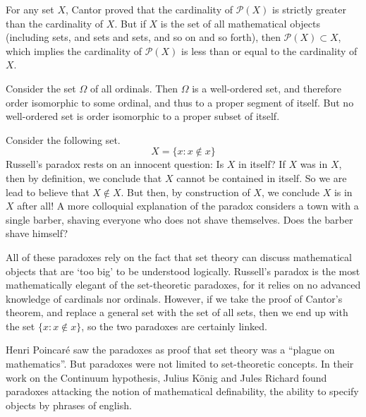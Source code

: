\begin{example}
    For any set $X$, Cantor proved that the cardinality of $\mathcal{P}(X)$ is strictly greater than the cardinality of $X$. But if $X$ is the set of all mathematical objects (including sets, and sets and sets, and so on and so forth), then $\mathcal{P}(X) \subset X$, which implies the cardinality of $\mathcal{P}(X)$ is less than or equal to the cardinality of $X$.
\end{example}

\begin{example}
    Consider the set $\Omega$ of all ordinals. Then $\Omega$ is a well-ordered set, and therefore order isomorphic to some ordinal, and thus to a proper segment of itself. But no well-ordered set is order isomorphic to a proper subset of itself.
\end{example}

\begin{example}
    Consider the following set.
    \[ X = \{ x: x \not \in x \} \]
    Russell's paradox rests on an innocent question: Is $X$ in itself? If $X$ was in $X$, then by definition, we conclude that $X$ cannot be contained in itself. So we are lead to believe that $X \not \in X$. But then, by construction of $X$, we conclude $X$ is in $X$ after all! A more colloquial explanation of the paradox considers a town with a single barber, shaving everyone who does not shave themselves. Does the barber shave himself?
\end{example}

All of these paradoxes rely on the fact that set theory can discuss mathematical objects that are `too big' to be understood logically. Russell's paradox is the most mathematically elegant of the set-theoretic paradoxes, for it relies on no advanced knowledge of cardinals nor ordinals. However, if we take the proof of Cantor's theorem, and replace a general set with the set of all sets, then we end up with the set $\{ x : x \not \in x \}$, so the two paradoxes are certainly linked.

Henri Poincar\'{e} saw the paradoxes as proof that set theory was a ``plague on mathematics''. But paradoxes were not limited to set-theoretic concepts. In their work on the Continuum hypothesis, Julius K\"{o}nig and Jules Richard found paradoxes attacking the notion of mathematical definability, the ability to specify objects by phrases of english.

